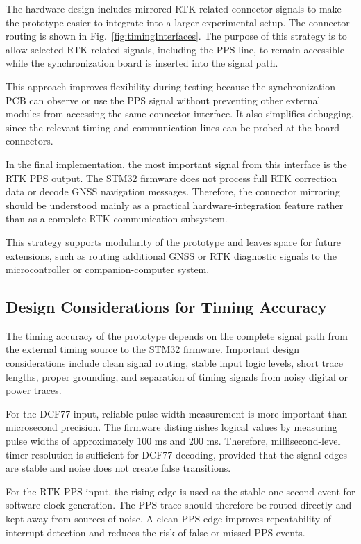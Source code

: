 The hardware design includes mirrored RTK-related connector signals to make the prototype easier to integrate into a larger experimental setup. The connector routing is shown in Fig.~\ref{fig:timingInterfaces}. The purpose of this strategy is to allow selected RTK-related signals, including the PPS line, to remain accessible while the synchronization board is inserted into the signal path.

This approach improves flexibility during testing because the synchronization PCB can observe or use the PPS signal without preventing other external modules from accessing the same connector interface. It also simplifies debugging, since the relevant timing and communication lines can be probed at the board connectors.

In the final implementation, the most important signal from this interface is the RTK PPS output. The STM32 firmware does not process full RTK correction data or decode GNSS navigation messages. Therefore, the connector mirroring should be understood mainly as a practical hardware-integration feature rather than as a complete RTK communication subsystem.

This strategy supports modularity of the prototype and leaves space for future extensions, such as routing additional GNSS or RTK diagnostic signals to the microcontroller or companion-computer system.

\subsection{Design Considerations for Timing Accuracy}

The timing accuracy of the prototype depends on the complete signal path from the external timing source to the STM32 firmware. Important design considerations include clean signal routing, stable input logic levels, short trace lengths, proper grounding, and separation of timing signals from noisy digital or power traces.

For the DCF77 input, reliable pulse-width measurement is more important than microsecond precision. The firmware distinguishes logical values by measuring pulse widths of approximately 100 ms and 200 ms. Therefore, millisecond-level timer resolution is sufficient for DCF77 decoding, provided that the signal edges are stable and noise does not create false transitions.

For the RTK PPS input, the rising edge is used as the stable one-second event for software-clock generation. The PPS trace should therefore be routed directly and kept away from sources of noise. A clean PPS edge improves repeatability of interrupt detection and reduces the risk of false or missed PPS events.

